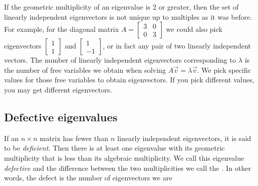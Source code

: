 If the geometric multiplicity of an eigenvalue is 2 or greater,
then the set of linearly independent eigenvectors is not unique up to
multiples as it was before.  For example, for the diagonal matrix $A =
\left[ \begin{smallmatrix} 3 & 0 \\ 0 & 3 \end{smallmatrix} \right]$
we could also pick eigenvectors
$\left[ \begin{smallmatrix} 1 \\ 1 \end{smallmatrix} \right]$
and
$\left[ \begin{smallmatrix} 1 \\ -1 \end{smallmatrix} \right]$, or in fact
any pair of two linearly independent vectors.  The number of linearly
independent eigenvectors corresponding to $\lambda$
is the number of free variables we obtain when solving $A\vec{v} =
\lambda \vec{v}$.  We pick specific values for those free variables to
obtain eigenvectors.  If you pick different values, you may get different
eigenvectors.


\subsection{Defective eigenvalues}

If an $n \times n$ matrix has fewer than $n$ linearly independent
eigenvectors, it is said to be \emph{deficient}.
Then there is at least
one eigenvalue with its geometric multiplicity that is less than its
algebraic
multiplicity.  We call this eigenvalue \emph{defective}
and the difference
between the two multiplicities we call the \emph{}.
In other words, the defect is the number of eigenvectors we are

